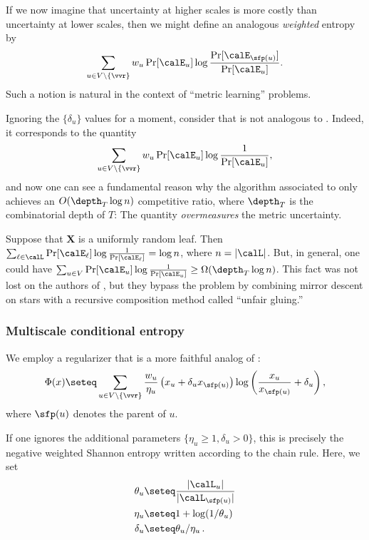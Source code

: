 If we now imagine that uncertainty at higher scales is more costly
than uncertainty at lower scales, then
we might define an analogous \emph{weighted} entropy by
\begin{equation}\label{eq:weighted-ent}
\sum_{u\in V\setminus\{\vvr\}}
w_u \Pr[\calE_u] \log \frac{\Pr[\calE_{\sfp(u)}]}{\Pr[\calE_{u}]}.
\end{equation}
Such a notion is natural in the context of ``metric learning'' problems.

Ignoring the $\{\delta_u\}$ values for a moment, consider that  is not analogous
to .  Indeed, it corresponds to the quantity
\begin{equation}\label{eq:badent}
\sum_{u\in V\setminus\{\vvr\}}w_u
\Pr[\calE_u] \log \frac{1}{\Pr[\calE_u]},
\end{equation}
and now one can see a fundamental reason why the algorithm associated to 
only achieves an $O(\depth_T \log n)$ competitive ratio, where $\depth_T$ is the combinatorial
depth of $T$: The quantity  \emph{overmeasures} the metric uncertainty.

Suppose that $\bm{X}$ is a uniformly random leaf.  Then
$\sum_{\ell\in\calL} \Pr[\calE_\ell] \log \frac{1}{\Pr[\calE_{\ell}]} = \log n$, where $n=|\calL|$.
But, in general, one could have $\sum_{u \in V} \Pr[\calE_u] \log \frac{1}{\Pr[\calE_u]} \geq \Omega(\depth_T \log n)$.
This fact was not lost on the authors of \cite{BCLL19},
but they bypass the problem by combining mirror descent on stars with a recursive
composition method called ``unfair gluing.''

\subsubsection{Multiscale conditional entropy}

We employ a regularizer that is a more faithful analog of :
\begin{equation}\label{eq:reg1}
\Phi(x) \seteq \sum_{u \in V \setminus \{\vvr\}} \frac{w_u}{\eta_u} \left(x_u + \delta_u x_{\sfp(u)}\right) \log \left(\frac{x_u}{x_{\sfp(u)}}+\delta_u\right),
\end{equation}
where $\sfp(u)$ denotes the parent of $u$.

If one ignores the additional parameters $\{\eta_u \geq 1,\delta_u > 0\}$, this is precisely the negative
weighted Shannon entropy written according to the chain rule.
Here, we set
\begin{align}
\theta_u &\seteq \frac{|\calL_u|}{|\calL_{\sfp(u)}|} \label{eq:thetadef} \\
\eta_u &\seteq 1+\log(1/\theta_u) \label{eq:etadef} \\
\delta_u &\seteq \theta_u/\eta_u\,. \label{eq:deltadef}
\end{align}

